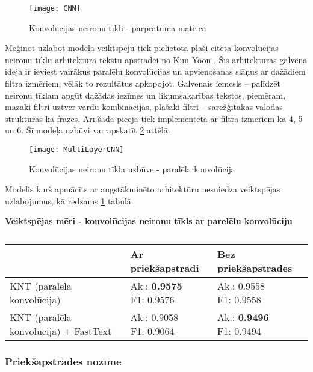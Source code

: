 \begin{figure}[H]
	\centering
	\texttt{[image: CNN]}
	\caption{Konvolūcijas neironu tīkli - pārpratuma matrica}
	\label{fig:CNN}
\end{figure}

Mēģinot uzlabot modeļa veiktspēju tiek pielietota plaši citēta konvolūcijas neironu tīklu arhitektūra tekstu apstrādei no Kim Yoon \cite{kimYoonCNN}. Šīs arhitektūras galvenā ideja ir ieviest vairākus paralēlu konvolūcijas un apvienošanas slāņus ar dažādiem filtra izmēriem, vēlāk to rezultātus apkopojot. Galvenais iemesls – palīdzēt neironu tīklam apgūt dažādas iezīmes un likumsakarības tekstos, piemēram, mazāki filtri uztver vārdu kombinācijas, plašāki filtri – sarežģītākas valodas struktūras kā frāzes. Arī šāda pieeja tiek implementēta ar filtra izmēriem kā 4, 5 un 6. Šī modeļa uzbūvi var apskatīt \ref{fig:MultiLayerCNN} attēlā.

\begin{figure}[H]
	\centering
	\texttt{[image: MultiLayerCNN]}
	\caption{Konvolūcijas neironu tīkla uzbūve - paralēla konvolūcija}
	\label{fig:MultiLayerCNN}
\end{figure}

Modelis kurš apmācīts ar augstākminēto arhitektūru nesniedza veiktspējas uzlabojumus, kā redzams \ref{tab:score_cnn_multi} tabulā.

\begin{table}[H]
\centering
\caption{\label{tab:score_cnn_multi}}
\textbf{Veiktspējas mēri -  konvolūcijas neironu tīkls ar parelēlu konvolūciju\\}
\begin{tabular}{|l|l|l|}
\hline
                                      & Ar priekšapstrādi & Bez priekšapstrādes \\ \hline
KNT (paralēla konvolūcija)            &  \makecell{Ak.: \textbf{0.9575} \\ F1: 0.9576}             &  \makecell{Ak.: 0.9558 \\ F1:  0.9558}                \\ \hline
KNT (paralēla konvolūcija) + FastText &  \makecell{Ak.: 0.9058 \\ F1: 0.9064}             &  \makecell{Ak.: \textbf{0.9496} \\ F1: 0.9494}   \\ \hline             
\end{tabular}
\end{table}

\subsubsection{Priekšapstrādes nozīme}

